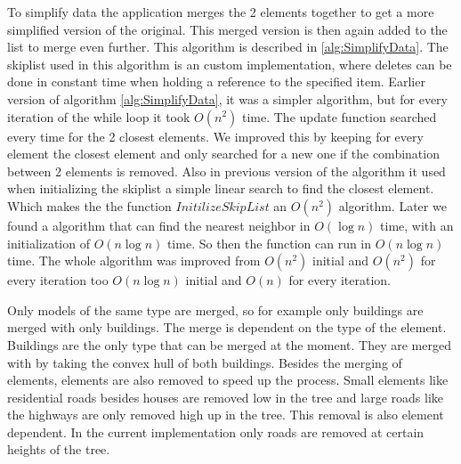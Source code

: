To simplify data the application merges the 2 elements together to get a more simplified version of the original. This merged version is then again added to the list to merge even further. This algorithm is described in \ref{alg:SimplifyData}. The skiplist used in this algorithm is an custom implementation, where deletes can be done in constant time when holding a reference to the specified item. Earlier version of algorithm \ref{alg:SimplifyData}, it was a simpler algorithm, but for every iteration of the while loop it took $O(n^2)$ time. The update function searched every time for the 2 closest elements. We improved this by keeping for every element the closest element and only searched for a new one if the combination between 2 elements is removed. Also in previous version of the algorithm it used when initializing the skiplist a simple linear search to find the closest element. Which makes the the function $InitilizeSkipList$ an $O(n^2)$ algorithm. Later we found a algorithm that can find the nearest neighbor in $O(\log{n})$ time, with an initialization of $O(n\log{n})$ time. So then the function can run in $O(n\log{n})$ time. The whole algorithm was improved from $O(n^2)$ initial and $O(n^2)$ for every iteration too $O(n\log{n})$ initial and $O(n)$ for every iteration.

Only models of the same type are merged, so for example only buildings are merged with only buildings. The merge is dependent on the type of the element. Buildings are the only type that can be merged at the moment. They are merged with by taking the convex hull of both buildings. Besides the merging of elements, elements are also removed to speed up the process. Small elements like residential roads besides houses are removed low in the tree and large roads like the highways are only removed high up in the tree. This removal is also element dependent. In the current implementation only roads are removed at certain heights of the tree.

